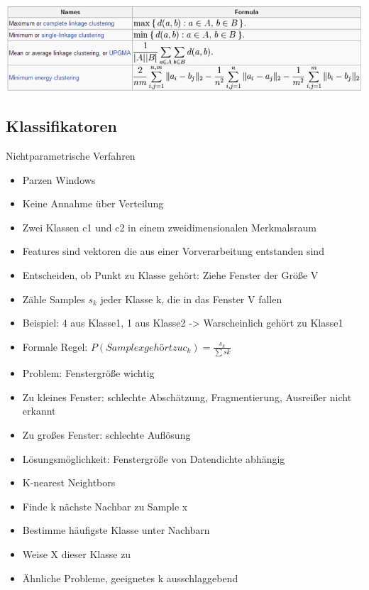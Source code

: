 \documentclass[a4paper,10pt,oneside]{article}
\begin{document}
\includegraphics[scale=0.65]{Grafiken/linkage.png}


\subsection{Klassifikatoren}
Nichtparametrische Verfahren\\
\begin{itemize}
	\item Parzen Windows
	\item Keine Annahme über Verteilung
	\item Zwei Klassen c1 und c2 in einem zweidimensionalen Merkmalsraum
	\item Features sind vektoren die aus einer Vorverarbeitung entstanden sind
	\item Entscheiden, ob Punkt zu Klasse gehört: Ziehe Fenster der Größe V
	\item Zähle Samples $s_k$ jeder Klasse k, die in das Fenster V fallen
	\item Beispiel: 4 aus Klasse1, 1 aus Klasse2 -> Warscheinlich gehört zu Klasse1
	\item Formale Regel: $P(Sample x gehört zu c_k)=\frac{s_k}{\sum sk}$
	\item Problem: Fenstergröße wichtig
	\item Zu kleines Fenster: schlechte Abschätzung, Fragmentierung, Ausreißer nicht erkannt
	\item Zu großes Fenster: schlechte Auflösung
	\item Lösungsmöglichkeit: Fenstergröße von Datendichte abhängig
\end{itemize}

\begin{itemize}
	\item K-nearest Neightbors
	\item Finde k nächste Nachbar zu Sample x
	\item Bestimme häufigste Klasse unter Nachbarn
	\item Weise X dieser Klasse zu
	\item Ähnliche Probleme, geeignetes k ausschlaggebend
\end{itemize}
\end{document}
